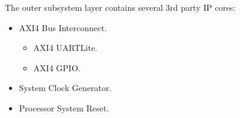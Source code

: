 

The outer subsystem layer contains several 3rd party IP cores:

\begin{itemize}
\item AXI4 Bus Interconnect.

\begin{itemize}
\item AXI4 UARTLite.
\item AXI4 GPIO.
\end{itemize}

\item System Clock Generator.

\item Processor System Reset.

\end{itemize}
